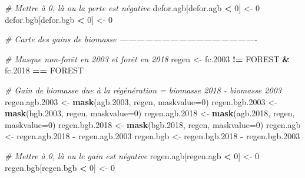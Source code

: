 \documentclass[a4paper, notitlepage, 12pt, krantz2]{krantz}
\newenvironment{Shaded}{\begin{snugshade}}{\end{snugshade}}
\newcommand{\CommentTok}[1]{\textcolor[rgb]{0.56,0.35,0.01}{\textit{#1}}}
\newcommand{\DataTypeTok}[1]{\textcolor[rgb]{0.13,0.29,0.53}{#1}}
\newcommand{\DecValTok}[1]{\textcolor[rgb]{0.00,0.00,0.81}{#1}}
\newcommand{\FloatTok}[1]{\textcolor[rgb]{0.00,0.00,0.81}{#1}}
\newcommand{\KeywordTok}[1]{\textcolor[rgb]{0.13,0.29,0.53}{\textbf{#1}}}
\newcommand{\NormalTok}[1]{#1}
\newcommand{\OperatorTok}[1]{\textcolor[rgb]{0.81,0.36,0.00}{\textbf{#1}}}
\newcommand{\StringTok}[1]{\textcolor[rgb]{0.31,0.60,0.02}{#1}}
\begin{document}
\begin{Shaded}
\begin{Highlighting}[]
{\CommentTok{# Mettre à 0, là ou la perte est négative}
\NormalTok{defor.agb[defor.agb }\OperatorTok{<}\StringTok{ }\DecValTok{0}\NormalTok{] <-}\StringTok{ }\DecValTok{0}  
\NormalTok{defor.bgb[defor.bgb }\OperatorTok{<}\StringTok{ }\DecValTok{0}\NormalTok{] <-}\StringTok{ }\DecValTok{0} 


\CommentTok{# Carte des gains de biomasse -------------------------------------------------}

\CommentTok{# Masque non-forêt en 2003 et forêt en 2018}
\NormalTok{regen <-}\StringTok{ }\NormalTok{fc}\FloatTok{.2003} \OperatorTok{!=}\StringTok{ }\NormalTok{FOREST }\OperatorTok{&}\StringTok{ }\NormalTok{fc}\FloatTok{.2018} \OperatorTok{==}\StringTok{ }\NormalTok{FOREST}

\CommentTok{# Gain de biomasse due à la régénération = biomasse 2018 - biomasse 2003}
\NormalTok{regen.agb}\FloatTok{.2003}\NormalTok{ <-}\StringTok{ }\KeywordTok{mask}\NormalTok{(agb}\FloatTok{.2003}\NormalTok{, regen, }\DataTypeTok{maskvalue=}\DecValTok{0}\NormalTok{)}
\NormalTok{regen.bgb}\FloatTok{.2003}\NormalTok{ <-}\StringTok{ }\KeywordTok{mask}\NormalTok{(bgb}\FloatTok{.2003}\NormalTok{, regen, }\DataTypeTok{maskvalue=}\DecValTok{0}\NormalTok{)}
\NormalTok{regen.agb}\FloatTok{.2018}\NormalTok{ <-}\StringTok{ }\KeywordTok{mask}\NormalTok{(agb}\FloatTok{.2018}\NormalTok{, regen, }\DataTypeTok{maskvalue=}\DecValTok{0}\NormalTok{)}
\NormalTok{regen.bgb}\FloatTok{.2018}\NormalTok{ <-}\StringTok{ }\KeywordTok{mask}\NormalTok{(bgb}\FloatTok{.2018}\NormalTok{, regen, }\DataTypeTok{maskvalue=}\DecValTok{0}\NormalTok{)}
\NormalTok{regen.agb <-}\StringTok{ }\NormalTok{regen.agb}\FloatTok{.2018} \OperatorTok{-}\StringTok{ }\NormalTok{regen.agb}\FloatTok{.2003}
\NormalTok{regen.bgb <-}\StringTok{ }\NormalTok{regen.bgb}\FloatTok{.2018} \OperatorTok{-}\StringTok{ }\NormalTok{regen.bgb}\FloatTok{.2003}

\CommentTok{# Mettre à 0, là ou le gain est négative}
\NormalTok{regen.agb[regen.agb }\OperatorTok{<}\StringTok{ }\DecValTok{0}\NormalTok{] <-}\StringTok{ }\DecValTok{0}
\NormalTok{regen.bgb[regen.bgb }\OperatorTok{<}\StringTok{ }\DecValTok{0}\NormalTok{] <-}\StringTok{ }\DecValTok{0}


}
\end{Highlighting}
\end{Shaded}
\end{document}

